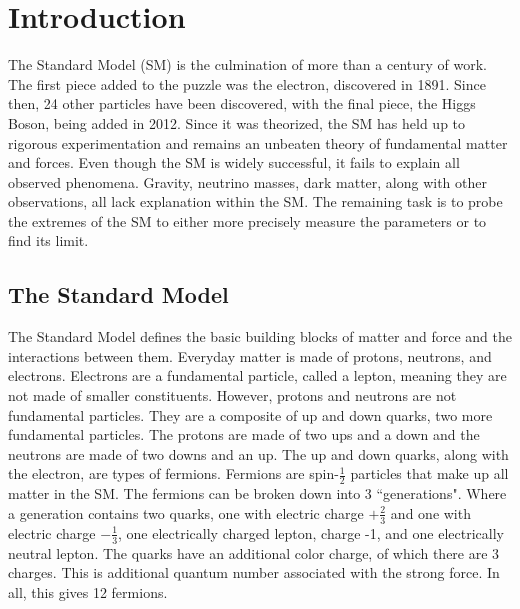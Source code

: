 \chapter{Introduction}
The Standard Model (SM) is the culmination of more than a century of work. The first piece added to the puzzle was the electron, discovered in 1891. Since then, 24 other particles have been discovered, with the final piece, the Higgs Boson, being added in 2012. Since it was theorized, the SM has held up to rigorous experimentation and remains an unbeaten theory of fundamental matter and forces. Even though the SM is widely successful, it fails to explain all observed phenomena. Gravity, neutrino masses, dark matter, along with other observations, all lack explanation within the SM. The remaining task is to probe the extremes of the SM to either more precisely measure the parameters or to find its limit.
\section{The Standard Model}
The Standard Model defines the basic building blocks of matter and force and the interactions between them. Everyday matter is made of protons, neutrons, and electrons. Electrons are a fundamental particle, called a lepton, meaning they are not made of smaller constituents. However, protons and neutrons are not fundamental particles. They are a composite of up and down quarks, two more fundamental particles. The protons are made of two ups and a down and the neutrons are made of two downs and an up. The up and down quarks, along with the electron, are types of fermions. \newline
\indent Fermions are spin-${\frac{1}{2}}$ particles that make up all matter in the SM. The fermions can be broken down into 3 ``generations". Where a generation contains two quarks, one with electric charge ${+\frac{2}{3}}$ and one with electric charge ${-\frac{1}{3}}$, one electrically charged lepton, charge -1, and one electrically neutral lepton. The quarks have an additional color charge, of which there are 3 charges. This is additional quantum number associated with the strong force. In all, this gives 12 fermions. \newline 

